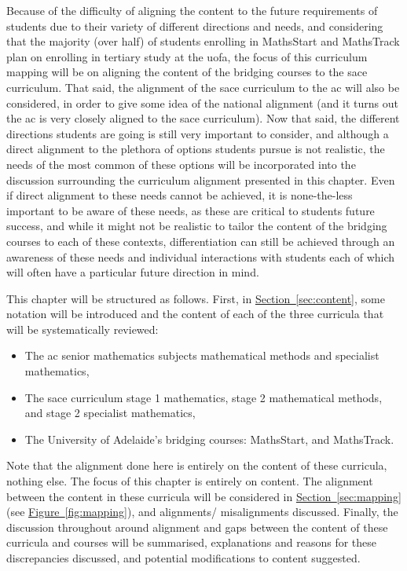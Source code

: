 \documentclass[twoside,12pt,a4paper]{report}
\newcommand{\refsec}[1]{\hyperref[sec:#1]{Section~\ref{sec:#1}}}
\newcommand{\reffig}[1]{\hyperref[fig:#1]{Figure~\ref{fig:#1}}}
\begin{document}
Because of the difficulty of aligning the content to the future requirements of students due to their variety of different directions and needs, and considering that the majority (over half) of students enrolling in MathsStart and MathsTrack plan on enrolling in tertiary study at the \gls{uofa}, the focus of this curriculum mapping will be on aligning the content of the bridging courses to the \gls{sace} curriculum. That said, the alignment of the \gls{sace} curriculum to the \gls{ac} will also be considered, in order to give some idea of the national alignment (and it turns out the \gls{ac} is very closely aligned to the \gls{sace} curriculum). Now that said, the different directions students are going is still very important to consider, and although a direct alignment to the plethora of options students pursue is not realistic, the needs of the most common of these options will be incorporated into the discussion surrounding the curriculum alignment presented in this chapter. Even if direct alignment to these needs cannot be achieved, it is none-the-less important to be aware of these needs, as these are critical to students future success, and while it might not be realistic to tailor the content of the bridging courses to each of these contexts, differentiation can still be achieved through an awareness of these needs and individual interactions with students each of which will often have a particular future direction in mind.

This chapter will be structured as follows. First, in \refsec{content}, some notation will be introduced and the content of each of the three curricula that will be systematically reviewed:
\begin{itemize}
	\item The \gls{ac} senior mathematics subjects mathematical methods and specialist mathematics,
	\item The \gls{sace} curriculum stage 1 mathematics, stage 2 mathematical methods, and stage 2 specialist mathematics,
	\item The University of Adelaide's bridging courses: MathsStart, and MathsTrack.
\end{itemize}
Note that the alignment done here is entirely on the content of these curricula, nothing else. The focus of this chapter is entirely on content. The alignment between the content in these curricula will be considered in \refsec{mapping} (see \reffig{mapping}), and alignments/ misalignments discussed. Finally, the discussion throughout around alignment and gaps between the content of these curricula and courses will be summarised, explanations and reasons for these discrepancies discussed, and potential modifications to content suggested. 
\end{document}

